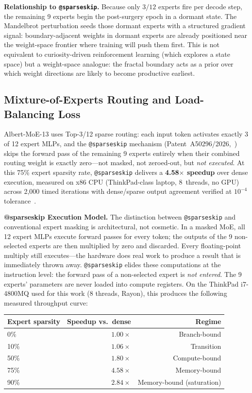 \documentclass[journal,10pt,twocolumn]{IEEEtran}
\begin{document}
\textbf{Relationship to \texttt{@sparseskip}.} Because only $3/12$ experts
fire per decode step, the remaining 9 experts begin the post-surgery epoch in
a dormant state. The Mandelbrot perturbation seeds those dormant experts with
a structured gradient signal: boundary-adjacent weights in dormant experts are
already positioned near the weight-space frontier where training will push
them first. This is not equivalent to curiosity-driven reinforcement learning
(which explores a state space) but a weight-space analogue: the fractal
boundary acts as a prior over which weight directions are likely to become
productive earliest.

\subsection{Mixture-of-Experts Routing and Load-Balancing Loss}
\label{subsec:moe_routing}

Albert-MoE-13 uses Top-3/12 sparse routing: each input token activates
exactly 3 of 12 expert MLPs, and the \texttt{@sparseskip} mechanism
(Patent~A50296/2026,~\cite{sparseskip2026}) skips the forward pass of the
remaining 9 experts entirely when their combined routing weight is exactly
zero---not masked, not zeroed-out, but \emph{not executed}. At this 75\%
expert sparsity rate, \texttt{@sparseskip} delivers a \textbf{4.58$\times$
speedup} over dense execution, measured on x86 CPU (ThinkPad-class laptop,
8~threads, no GPU) across 2{,}000 timed iterations with dense/sparse output
agreement verified at $10^{-4}$ tolerance~\cite{tis2026moetest}.

\textbf{@sparseskip Execution Model.}
The distinction between \texttt{@sparseskip} and conventional expert masking
is architectural, not cosmetic. In a masked MoE, all 12 expert MLPs execute
forward passes for every token; the outputs of the 9 non-selected experts are
then multiplied by zero and discarded. Every floating-point multiply still
executes---the hardware does real work to produce a result that is immediately
thrown away. \texttt{@sparseskip} elides these computations at the instruction
level: the forward pass of a non-selected expert is \emph{not entered}. The
9 experts' parameters are never loaded into compute registers. On the ThinkPad
i7-4800MQ used for this work (8 threads, Rayon), this produces the following
measured throughput curve:

\begin{center}
\small
\begin{tabular}{lrr}
\toprule
Expert sparsity & Speedup vs.\ dense & Regime \\
\midrule
0\%   & $1.00\times$ & Branch-bound \\
10\%  & $1.06\times$ & Transition \\
50\%  & $1.80\times$ & Compute-bound \\
75\%  & $4.58\times$ & Memory-bound \\
90\%  & $2.84\times$ & Memory-bound (saturation) \\
\bottomrule
\end{tabular}
\end{center}
\end{document}
